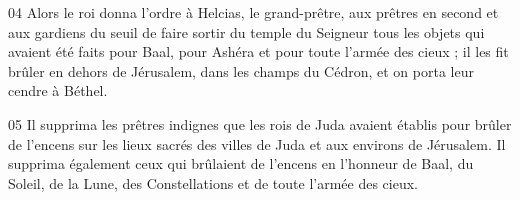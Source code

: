 
04 Alors le roi donna l’ordre à Helcias, le grand-prêtre, aux prêtres en second et aux gardiens du seuil de faire sortir du temple du Seigneur tous les objets qui avaient été faits pour Baal, pour Ashéra et pour toute l’armée des cieux ; il les fit brûler en dehors de Jérusalem, dans les champs du Cédron, et on porta leur cendre à Béthel.

05 Il supprima les prêtres indignes que les rois de Juda avaient établis pour brûler de l’encens sur les lieux sacrés des villes de Juda et aux environs de Jérusalem. Il supprima également ceux qui brûlaient de l’encens en l’honneur de Baal, du Soleil, de la Lune, des Constellations et de toute l’armée des cieux.
